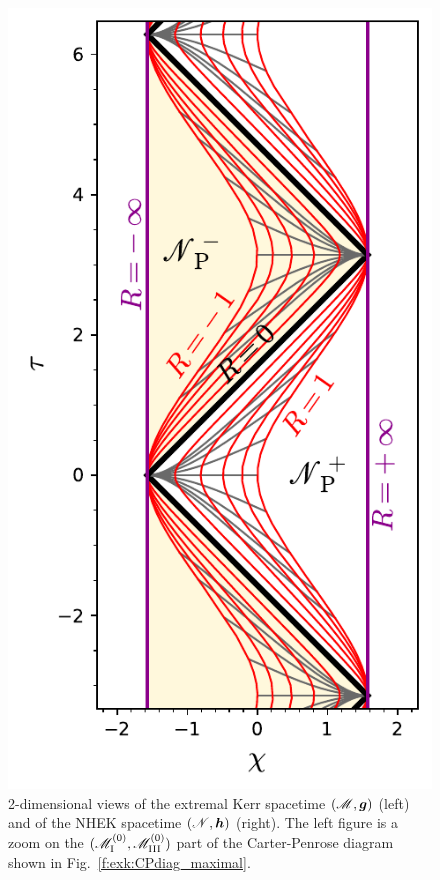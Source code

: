 \begin{figure}
\begin{minipage}[c]{0.35\textwidth}
\includegraphics[width=\textwidth]{exk_NHEK_spacetime.pdf}
\end{minipage}
\caption[]{\label{f:exk:compar_Kerr_NHEK} \footnotesize
2-dimensional views of the extremal Kerr spacetime  $(\mathscr{M}, \bm{g})$ (left) and of
the NHEK spacetime $(\mathscr{N},\bm{h})$ (right). The left figure is a zoom
on the $(\mathscr{M}_{\rm I}^{(0)}, \mathscr{M}_{\rm III}^{(0)})$ part of
the Carter-Penrose diagram
shown in Fig.~\ref{f:exk:CPdiag_maximal}.
}
\end{figure}
